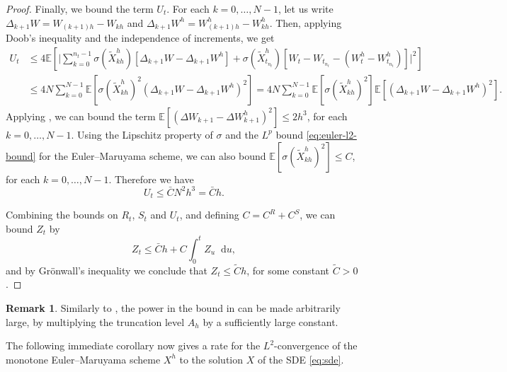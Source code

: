 \documentclass[oneside]{amsart}
\theoremstyle{definition}
\newtheorem{remark}[theorem]{Remark}
\newcommand{\D}{\mathop{}\!\mathrm{d}}
\def\E{{\mathbb E}}
\numberwithin{equation}{section}
\begin{document}
\begin{proof}
	Finally, we bound the term $U_t$. For each $k = 0, \dotsc, N - 1$, let us write $\Delta_{k+1} W = W_{(k+1)h} - W_{kh}$ and $\Delta_{k+1} W^h = W^h_{(k+1)h} - W^h_{kh}$. Then, applying Doob's inequality and the independence of increments, we get
	\begin{equation}
		\begin{split}
			U_t & \leq 4 \E \!\left[\bigg\lvert \sum_{k = 0}^{n_t - 1} \sigma(\tilde{X}^h_{{kh}}) \!\left[\Delta_{k+1} W - \Delta_{k+1} W^h \right] + \sigma(\tilde{X}^h_{t_{n_t}}) \!\left[W_t - W_{t_{n_t}} - (W^h_t - W^h_{t_{n_t}})\right]\bigg \rvert^2 \right]\\
			& \leq 4N\sum_{k = 0}^{N-1} \E \!\left[\sigma(\tilde{X}^h_{kh})^2(\Delta_{k+1} W - \Delta_{k+1} W^h)^2\right] = 4 N \sum_{k = 0}^{N - 1}\E \!\left[\sigma(\tilde{X}^h_{kh})^2\right]\E \!\left[(\Delta_{k+1} W - \Delta_{k+1} W^h)^2\right].
		\end{split}
	\end{equation}
	Applying , we can bound the term $\E[(\Delta W_{k+1} - \Delta W^h_{k+1})^2] \le 2h^{3}$, for each $k = 0, \dotsc, N - 1$. Using the Lipschitz property of $\sigma$ and the $L^p$ bound \eqref{eq:euler-l2-bound} for the Euler--Maruyama scheme, we can also bound $\E[\sigma(\tilde{X}^h_{kh})^2] \leq C$, for each $k = 0, \dotsc, N - 1$. Therefore we have
	\begin{equation}
		U_t \leq \bar{C} N^2 h^3 = \bar{C} h.
	\end{equation}
	
	Combining the bounds on $R_t$, $S_t$ and $U_t$, and defining $C = C^R + C^S$, we can bound $Z_t$ by
	\begin{equation}
		Z_t \leq \bar{C}h + C \int_0^t Z_u \D u,
	\end{equation}
	and by Gr\"onwall's inequality we conclude that $Z_t \leq \tilde{C} h$, for some constant $\tilde C >0$.
\end{proof}

\begin{remark}
	Similarly to , the power in the bound in  can be made arbitrarily large, by multiplying the truncation level $A_h$ by a sufficiently large constant.
\end{remark}

The following immediate corollary now gives a rate for the $L^2$-convergence of the monotone Euler--Maruyama scheme $X^h$ to the solution $X$ of the SDE \eqref{eq:sde}.
\end{document}

